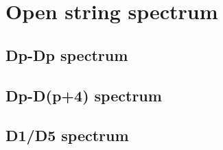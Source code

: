 

\chapter{Open string spectrum}
\label{chap:method}
\pagestyle{fancy}

\section{Dp-Dp spectrum}

\section{Dp-D(p+4) spectrum}

\section{D1/D5 spectrum}